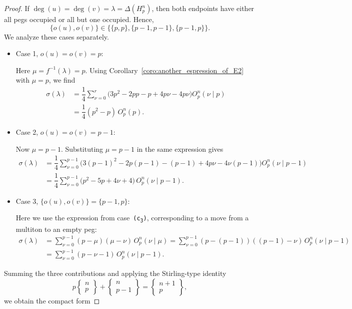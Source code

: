\documentclass[10pt,a4paper]{amsart}
\begin{document}
\begin{proof}
If $\deg(u)=\deg(v)=\lambda=\Delta(H_p^n)$, then both endpoints have either all pegs occupied or all but one occupied. Hence,
\[
\{o(u),o(v)\}\in\bigl\{\{p,p\},\{p-1,p-1\},\{p-1,p\}\bigr\}.
\]
We analyze these cases separately.


\noindent
\begin{itemize}
    \item Case 1, $o(u)=o(v)=p$:

Here $\mu=f^{-1}(\lambda)=p$.  
Using Corollary~\ref{coro:another_espression_of_E2} with $\mu=p$, we find
\begin{align*}
\sigma(\lambda)
&= \dfrac{1}{4}   \sum_{\nu = 0}^{r} 
   \bigl(3p^{2} -2pp -p + 4p\nu -4p\nu\bigr) O_p^n(\nu \mid p)\\
&= \dfrac{1}{4}  (p^{2}-p)\,O_p^n(p).
\end{align*}

\item Case 2, $o(u)=o(v)=p-1$: 

Now $\mu=p-1$. Substituting $\mu=p-1$ in the same expression gives
\begin{align*}
\sigma(\lambda)
&= \dfrac{1}{4}   \sum_{\nu = 0}^{p-1} 
   \bigl(3(p-1)^2 -2p(p-1)-(p-1)+4p\nu-4\nu(p-1)\bigr)
   O_p^n(\nu \mid p-1)\\
&= \dfrac{1}{4}   \sum_{\nu = 0}^{p-1} 
   \bigl(p^{2}-5p+4\nu+4\bigr)\,O_p^n(\nu \mid p-1).
\end{align*}

\item  Case 3,  $\{o(u),o(v)\}=\{p-1,p\}$:

Here we use the expression from case~\texttt{(c\textsubscript{3})}, corresponding to a move from a multiton to an empty peg:
\begin{align*}
\sigma(\lambda)
&= \sum_{\nu = 0}^{p-1}(p-\mu)(\mu-\nu)\,O_p^n(\nu \mid \mu)
 = \sum_{\nu = 0}^{p-1}(p-(p-1))((p-1)-\nu)\,O_p^n(\nu \mid p-1)\\
&= \sum_{\nu = 0}^{p-1}(p-\nu-1)\,O_p^n(\nu \mid p-1).
\end{align*}
\end{itemize}
 
Summing the three contributions and applying the Stirling-type identity
\[
p\begin{Bmatrix} n\\p \end{Bmatrix}
   + \begin{Bmatrix} n\\p-1 \end{Bmatrix}
   = \begin{Bmatrix} n+1\\p \end{Bmatrix},
\]
we obtain the compact form


\end{proof}
\end{document}
